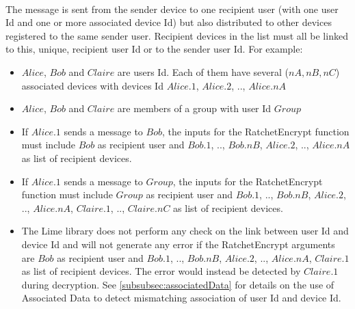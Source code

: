 \documentclass[a4paper,11pt]{article}
\begin{document}
      \paragraph{}The message is sent from the sender device to one recipient user (with one user Id and one or more associated device Id) but also distributed to other devices registered to the same sender user. Recipient devices in the list must all be linked to this, unique, recipient user Id or to the sender user Id. For example:
      \begin{itemize}
        \item $Alice$, $Bob$ and $Claire$ are users Id. Each of them have several ($nA, nB, nC$) associated devices with devices Id $Alice.1$, $Alice.2$, .., $Alice.nA$
        \item $Alice$, $Bob$ and $Claire$ are members of a group with user Id $Group$
        \item If $Alice.1$ sends a message to $Bob$, the inputs for the RatchetEncrypt function must include $Bob$ as recipient user and $Bob.1$, .., $Bob.nB$, $Alice.2$, .., $Alice.nA$ as list of recipient devices.
        \item If $Alice.1$ sends a message to $Group$, the inputs for the RatchetEncrypt function must include $Group$ as recipient user and $Bob.1$, .., $Bob.nB$, $Alice.2$, .., $Alice.nA$, $Claire.1$, .., $Claire.nC$ as list of recipient devices.
        \item The Lime library does not perform any check on the link between user Id and device Id and will not generate any error if the RatchetEncrypt arguments are $Bob$ as recipient user and $Bob.1$, .., $Bob.nB$, $Alice.2$, .., $Alice.nA$, $Claire.1$ as list of recipient devices. The error would instead be detected by $Claire.1$ during decryption. See \ref{subsubsec:associatedData} for details on the use of Associated Data to detect mismatching association of user Id and device Id.
        
      \end{itemize}
\end{document}
